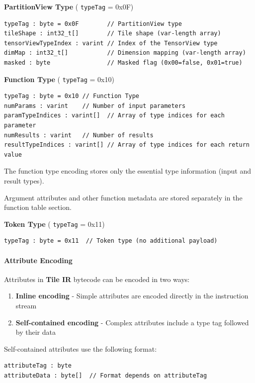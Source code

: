 \documentclass{article}
\begin{document}
\textbf{PartitionView Type} ( \texttt{typeTag} = 0x0F)


\begin{lstlisting}
typeTag : byte = 0x0F        // PartitionView type
tileShape : int32_t[]        // Tile shape (var-length array)
tensorViewTypeIndex : varint // Index of the TensorView type
dimMap : int32_t[]           // Dimension mapping (var-length array)
masked : byte                // Masked flag (0x00=false, 0x01=true)
\end{lstlisting}

\textbf{Function Type} ( \texttt{typeTag} = 0x10)


\begin{lstlisting}
typeTag : byte = 0x10 // Function Type
numParams : varint    // Number of input parameters
paramTypeIndices : varint[]  // Array of type indices for each parameter
numResults : varint   // Number of results
resultTypeIndices : varint[] // Array of type indices for each return value
\end{lstlisting}

The function type encoding stores only the essential type information (input and result types).

Argument attributes and other function metadata are stored separately in the function table section.


\textbf{Token Type} ( \texttt{typeTag} = 0x11)


\begin{lstlisting}
typeTag : byte = 0x11  // Token type (no additional payload)
\end{lstlisting}


\paragraph{Attribute Encoding}

Attributes in \textbf{Tile IR} bytecode can be encoded in two ways:


\begin{enumerate}
\item \textbf{Inline encoding} - Simple attributes are encoded directly in the instruction stream
\item \textbf{Self-contained encoding} - Complex attributes include a type tag followed by their data

\end{enumerate}
Self-contained attributes use the following format:


\begin{lstlisting}
attributeTag : byte
attributeData : byte[]  // Format depends on attributeTag
\end{lstlisting}
\end{document}

